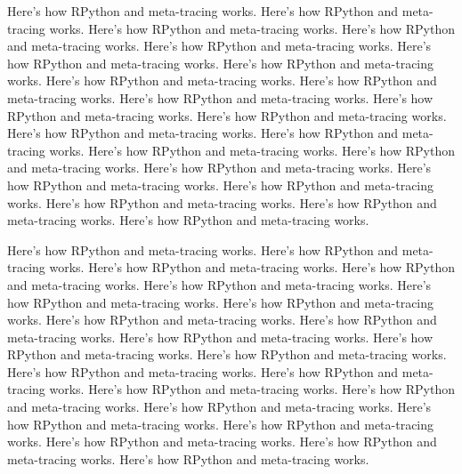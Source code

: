 Here's how RPython and meta-tracing works. Here's how RPython and meta-tracing works. Here's how RPython and meta-tracing works. Here's how RPython and meta-tracing works. Here's how RPython and meta-tracing works. Here's how RPython and meta-tracing works. Here's how RPython and meta-tracing works. Here's how RPython and meta-tracing works. Here's how RPython and meta-tracing works. Here's how RPython and meta-tracing works. Here's how RPython and meta-tracing works. Here's how RPython and meta-tracing works. Here's how RPython and meta-tracing works. Here's how RPython and meta-tracing works. Here's how RPython and meta-tracing works. Here's how RPython and meta-tracing works. Here's how RPython and meta-tracing works. Here's how RPython and meta-tracing works. Here's how RPython and meta-tracing works. Here's how RPython and meta-tracing works. Here's how RPython and meta-tracing works. Here's how RPython and meta-tracing works.

Here's how RPython and meta-tracing works. Here's how RPython and meta-tracing works. Here's how RPython and meta-tracing works. Here's how RPython and meta-tracing works. Here's how RPython and meta-tracing works. Here's how RPython and meta-tracing works. Here's how RPython and meta-tracing works. Here's how RPython and meta-tracing works. Here's how RPython and meta-tracing works. Here's how RPython and meta-tracing works. Here's how RPython and meta-tracing works. Here's how RPython and meta-tracing works. Here's how RPython and meta-tracing works. Here's how RPython and meta-tracing works. Here's how RPython and meta-tracing works. Here's how RPython and meta-tracing works. Here's how RPython and meta-tracing works. Here's how RPython and meta-tracing works. Here's how RPython and meta-tracing works. Here's how RPython and meta-tracing works. Here's how RPython and meta-tracing works. Here's how RPython and meta-tracing works.
